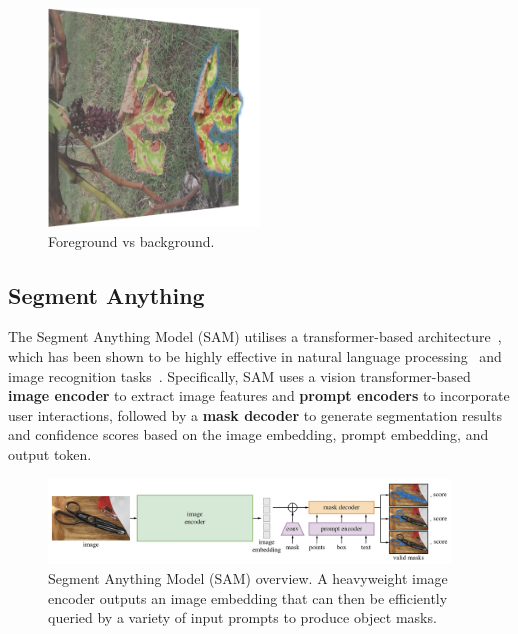 \documentclass[runningheads]{llncs}
\begin{document}
\begin{figure}[h!]
\centering
\includegraphics[width=0.5\textwidth]{imgs/fore_vs_back.png}
\caption{Foreground vs background.}
\label{fig:fore_vs_back}
\end{figure}

\subsection{Segment Anything}

The Segment Anything Model (SAM) utilises a transformer-based architecture~\cite{attention-Nips17}, which has been shown to be highly effective in natural language processing~\cite{GPT-3} and image recognition tasks~\cite{ViT2020}. Specifically, SAM uses a vision transformer-based \textbf{image encoder} to extract image features and \textbf{prompt encoders} to incorporate user interactions, followed by a \textbf{mask decoder} to generate segmentation results and confidence scores based on the image embedding, prompt embedding, and output token. 

\begin{figure}[h!]
\centering
\includegraphics[scale=0.5,width=0.95\textwidth]{imgs/SAM_model_diagram.png}
\caption{Segment Anything Model (SAM) overview. A heavyweight image encoder outputs an image embedding that can
then be efficiently queried by a variety of input prompts to produce object masks.}
\label{fig:sam-diagram}
\end{figure}
\end{document}
